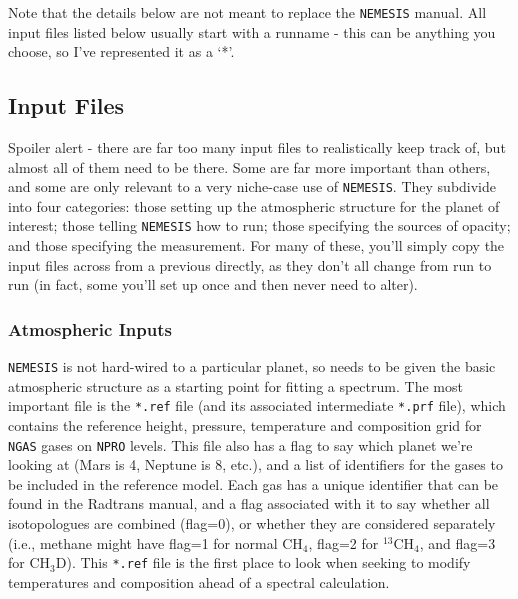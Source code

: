 \documentclass[final,5p,times,twocolumn,authoryear]{elsarticle}
\begin{document}
Note that the details below are not meant to replace the \verb#NEMESIS# manual.  All input files listed below usually start with a runname - this can be anything you choose, so I've represented it as a `*'.

\subsection{Input Files}

Spoiler alert - there are far too many input files to realistically keep track of, but almost all of them need to be there.  Some are far more important than others, and some are only relevant to a very niche-case use of \verb#NEMESIS#.  They subdivide into four categories:  those setting up the atmospheric structure for the planet of interest; those telling \verb#NEMESIS# how to run; those specifying the sources of opacity; and those specifying the measurement.  For many of these, you'll simply copy the input files across from a previous directly, as they don't all change from run to run (in fact, some you'll set up once and then never need to alter).

\subsubsection{Atmospheric Inputs}

\verb#NEMESIS# is not hard-wired to a particular planet, so needs to be given the basic atmospheric structure as a starting point for fitting a spectrum.  The most important file is the \verb#*.ref# file (and its associated intermediate \verb#*.prf# file), which contains the reference height, pressure, temperature and composition grid for \verb#NGAS# gases on \verb#NPRO# levels.  This file also has a flag to say which planet we're looking at (Mars is 4, Neptune is 8, etc.), and a list of identifiers for the gases to be included in the reference model.  Each gas has a unique identifier that can be found in the Radtrans manual, and a flag associated with it to say whether all isotopologues are combined (flag=0), or whether they are considered separately (i.e., methane might have flag=1 for normal CH$_4$, flag=2 for $^{13}$CH$_4$, and flag=3 for CH$_3$D).  This \verb#*.ref# file is the first place to look when seeking to modify temperatures and composition ahead of a spectral calculation.
\end{document}
